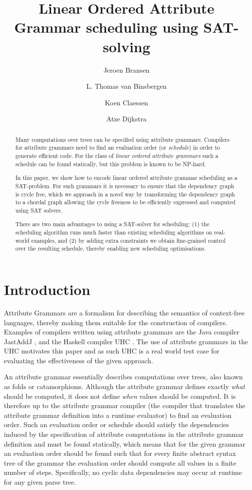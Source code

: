 \documentclass{llncs}
\title{Linear Ordered Attribute Grammar scheduling using SAT-solving}
\author{Jeroen Bransen\inst{1}  \and L. Thomas van Binsbergen\inst{2,1} \and Koen Claessen\inst{3} \and Atze Dijkstra\inst{1}}
\institute{Utrecht University, Utrecht, The Netherlands, \email{\{J.Bransen,atze\}@uu.nl}
\and Royal Holloway, University of London, Egham, UK, \email{Thomas.VanBinsbergen.2014@live.rhul.ac.uk}
\and Chalmers University of Technology, Gothenburg, Sweden, \email{koen@chalmers.se}}
\begin{document}
\maketitle

\begin{abstract}
Many computations over trees can be specified using attribute
grammars. Compilers for attribute grammars need to find an evaluation
order (or {\em schedule}) in order to generate efficient code. For the class
of {\em linear ordered attribute grammars} such a schedule can be found
statically, but this problem is known to be NP-hard.

In this paper, we show how to encode linear ordered attribute grammar
scheduling as a SAT-problem. For such grammars it is necessary to ensure that the dependency graph is cycle free, which we approach in a novel way by transforming the dependency graph to a chordal graph allowing the cycle freeness to be efficiently expressed and computed using SAT solvers.

There are two main advantages to using a SAT-solver for scheduling:
(1) the scheduling algorithm runs much faster than existing scheduling
algorithms on real-world examples, and (2) by adding extra constraints
we obtain fine-grained control over the resulting schedule, thereby
enabling new scheduling optimisations.


\end{abstract}

\section{Introduction}
Attribute Grammars \cite{knuth68} are a formalism for describing the semantics of context-free languages, thereby making them suitable for the construction of compilers. Examples of compilers written using attribute grammars are the Java compiler JastAddJ \cite{Ekman:2007}, and the Haskell compiler UHC \cite{Dijkstra:2009}. The use of attribute grammars in the UHC motivates this paper and as such UHC is a real world test case for evaluating the effectiveness of the given approach.

An attribute grammar essentially describes computations over trees, also known as folds or catamorphisms. Although the attribute grammar defines exactly \emph{what} should be computed, it does not define \emph{when} values should be computed. It is therefore up to the attribute grammar compiler (the compiler that translates the attribute grammar definition into a runtime evaluator) to find an evaluation order. Such an evaluation order or schedule should satisfy the dependencies induced by the specification of attribute computations in the attribute grammar definition and must be found statically, which means that for the given grammar an evaluation order should be found such that for every finite abstract syntax tree of the grammar the evaluation order should compute all values in a finite number of steps. Specifically, no cyclic data dependencies may occur at runtime for any given parse tree.
\end{document}
